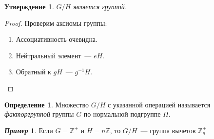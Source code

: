 \documentclass[a4paper, 14pt]{extarticle}
\newcommand{\integers}{\mathbb{Z}}
\theoremstyle{definition}
\newtheorem*{exmpl*}{\textit{Пример}}
\newtheorem{definition}{Определение}
\theoremstyle{plain}
\numberwithin{theorem}{section}
\numberwithin{definition}{section}
\newtheorem{statement}{Утверждение}
\numberwithin{statement}{section}
\numberwithin{lemma}{section}
\numberwithin{consequence}{section}
\begin{document}
	\newpage
	\begin{statement}
		$G/H$ является группой.
	\end{statement}
	\begin{proof}
		Проверим аксиомы группы:
		\begin{enumerate}
			\setlength\itemsep{0.1em}
			\item Ассоциативность очевидна.
			\item Нейтральный элемент~--- $eH.$
			\item Обратный к $gH$~--- $g^{-1}H.$ \qedhere 
		\end{enumerate}
	\end{proof}
	\begin{definition}
		Множество $G/H$ с указанной операцией называется \textit{факторгруппой} группы $G$ по нормальной подгруппе $H$.
	\end{definition}
	\begin{exmpl*}
		Если $G = \integers ^ + $ и $H = n\integers$, то $G/H$~--- группа вычетов $ \integers_n ^ +$
	\end{exmpl*}
	\newpage	
\end{document}
